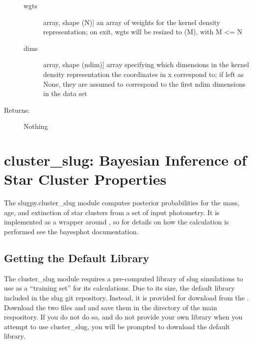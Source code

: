 \documentclass[letterpaper,10pt,english]{sphinxmanual}
\begin{document}
\begin{fulllineitems}
\begin{fulllineitems}
\begin{description}
\begin{description}
\item[{wgts}] \leavevmode{[}array, shape (N){]}
an array of weights for the kernel density
representation; on exit, wgts will be resized to (M),
with M \textless{}= N

\item[{dims}] \leavevmode{[}array, shape (ndim){]}
array specifying which dimensions in the kernel density
representation the coordinates in x correspond to; if
left as None, they are assumed to correspond to the
first ndim dimensions in the data set

\end{description}

\item[{Returns:}] \leavevmode
Nothing

\end{description}

\end{fulllineitems}


\end{fulllineitems}



\chapter{cluster\_slug: Bayesian Inference of Star Cluster Properties}
\label{\detokenize{cluster_slug:sec-cluster-slug}}\label{\detokenize{cluster_slug::doc}}\label{\detokenize{cluster_slug:cluster-slug-bayesian-inference-of-star-cluster-properties}}
The slugpy.cluster\_slug module computes posterior probabilities for the mass, age, and extinction of star clusters from a set of input photometry.  It is implemented as a wrapper around {\hyperref[\detokenize{bayesphot:sec-bayesphot}]{}}, so for details on how the calculation is performed see the bayesphot documentation.


\section{Getting the Default Library}
\label{\detokenize{cluster_slug:getting-the-default-library}}
The cluster\_slug module requires a pre-computed library of slug simulations to use as a “training set” for its calculations. Due to its size, the default library  included in the slug git repository. Instead, it is provided for download from the . Download the two files  and  and save them in the  directory of the main respository. If you do not do so, and do not provide your own library when you attempt to use cluster\_slug, you will be prompted to download the default library.
\end{document}
